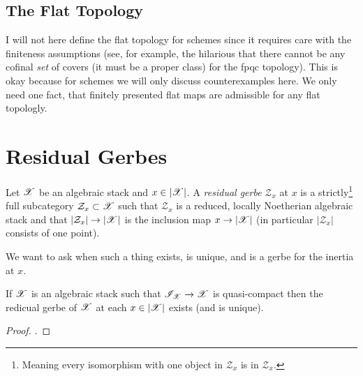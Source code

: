 \documentclass[12pt]{article}
\begin{document}
\subsection{The Flat Topology}

\begin{rmk}
I will not here define the flat topology for schemes since it requires care with the finiteness assumptions (see, for example, the hilarious  that there cannot be any cofinal \textit{set} of covers (it must be a proper class) for the fpqc topology). This is okay because for schemes we will only discuss counterexamples here. We only need one fact, that finitely presented flat maps are admissible for any flat topologly.
\end{rmk}

\section{Residual Gerbes}

\newcommand{\cZ}{\mathcal{Z}}

\begin{defn}
Let $\mathscr{X}$ be an algebraic stack and $x \in |\mathscr{X}|$. A \textit{residual gerbe} $\cZ_x$ at $x$ is a strictly\footnote{Meaning every isomorphism with one object in $\cZ_x$ is in $\cZ_x$.} full subcategory $\cZ_x \subset \X$ such that $\cZ_x$ is a reduced, locally Noetherian algebraic stack and that $|\cZ_x| \to |\X|$ is the inclusion map $x \to |\mathscr{X}|$ (in particular $|\cZ_x|$ consists of one point). 
\end{defn}

\begin{rmk}
We want to ask when such a thing exists, is unique, and is a gerbe for the inertia at $x$.
\end{rmk}

\begin{theorem}
If $\mathscr{X}$ is an algebraic stack such that $\mathscr{I}_{\mathscr{X}} \to \mathscr{X}$ is quasi-compact then the redicual gerbe of $\mathscr{X}$ at each $x \in |\mathscr{X}|$ exists (and is unique).
\end{theorem}

\begin{proof}
. 
\end{proof}

\begin{lemma}

\end{lemma}
\end{document}
